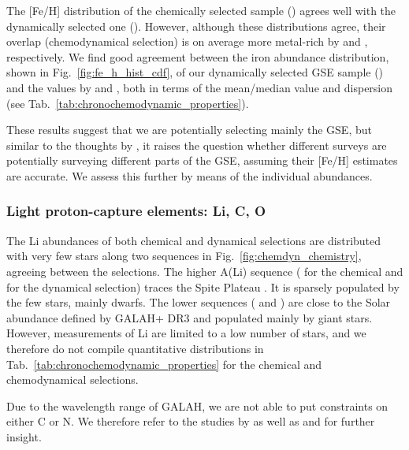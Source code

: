 \documentclass[fleqn,usenatbib]{mnras}
\begin{document}
The [Fe/H] distribution of the chemically selected sample () agrees well with the dynamically selected one (). However, although these distributions agree, their overlap (chemodynamical selection) is on average more metal-rich by  and , respectively. We find good agreement between the iron abundance distribution, shown in Fig.~\ref{fig:fe_h_hist_cdf}, of our dynamically selected GSE sample () and the values by \citet{Naidu2020} and \citet{Feuillet2021}, both in terms of the mean/median value and dispersion (see Tab.~\ref{tab:chronochemodynamic_properties}).

These results suggest that we are potentially selecting mainly the GSE, but similar to the thoughts by \citet{Bonifacio2021}, it raises the question whether different surveys are potentially surveying different parts of the GSE, assuming their [Fe/H] estimates are accurate. We assess this further by means of the individual abundances.

\subsubsection{Light proton-capture elements: Li, C, O}

The Li abundances of both chemical and dynamical selections are distributed with very few stars along two sequences in Fig.~\ref{fig:chemdyn_chemistry}, agreeing between the selections. The higher A(Li) sequence ( for the chemical and  for the dynamical selection) traces the Spite Plateau \citep{Spite1982}. It is sparsely populated by the few stars, mainly dwarfs. The lower sequences ( and ) are close to the Solar abundance defined by GALAH+ DR3 \citep{Buder2021} and populated mainly by giant stars. However, measurements of Li are limited to a low number of stars, and we therefore do not compile quantitative distributions in Tab.~\ref{tab:chronochemodynamic_properties} for the chemical and chemodynamical selections.

Due to the wavelength range of GALAH, we are not able to put constraints on either C or N. We therefore refer to the studies by \citet{Nissen2014} as well as \citet{Hawkins2015} and \citet{Hayes2018} for further insight.
\end{document}
